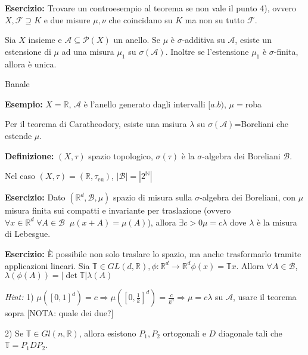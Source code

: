 {\bf Esercizio: } Trovare un controesempio al teorema se non vale il punto 4), ovvero $X, \mathcal{F} \supseteq K$ e due misure $\mu,\nu$ che coincidano su $K$ ma non su tutto $\mathcal{F}$.

\vspace{0.4cm}

Sia $X$ insieme e $\mathcal{A}\subseteq \mathcal{P}(X)$ un anello. Se $\mu$ è $\sigma$-additiva su $\mathcal{A}$, esiste un estensione di $\mu$ ad una misura $\mu_1$ su $\sigma(\mathcal{A})$. Inoltre se l'estensione $\mu_1$ è $\sigma$-finita, allora è unica.

\Dim Banale

\vspace{0.3cm}

{\bf Esempio: } $X=\mathbb{R}$, $\mathcal{A}$ è l'anello generato dagli intervalli $[a.b)$, $\mu=$roba

Per il teorema di Caratheodory, esiste una msiura $\lambda$ su $\sigma(\mathcal{A})$=Boreliani che estende $\mu$.

 
 
 {\bf Definizione: } $(X,\tau)$ spazio topologico, $\sigma(\tau)$ è la $\sigma$-algebra dei Boreliani $\mathcal{B}$.
 
 Nel caso $(X,\tau)=(\mathbb{R},\tau_{\text{eu}})$, $| \mathcal{B} | = | 2^{\mathbb{N}} |$
 
 {\bf Esercizio: } Dato $(\mathbb{R}^d, \mathcal{B}, \mu)$ spazio di misura sulla $\sigma$-algebra dei Boreliani, con $\mu$ misura finita sui compatti e invariante per traslazione (ovvero $\forall x \in \mathbb{R}^d \; \forall A \in \mathcal{B} \; \; \mu(x+A)=\mu(A)$), allora $\exists c>0 \mu=c\lambda$ dove $\lambda$ è la misura di Lebesgue.
 
{\bf Esercizio: } È possibile non solo traslare lo spazio, ma anche trasformarlo tramite applicazioni lineari. Sia $\mathbb{T}\in GL(d,\mathbb{R}), \phi:\mathbb{R}^d \rightarrow \mathbb{R}^d\phi(x)=\mathbb{T}x$. Allora $\forall A \in \mathcal{B}$, $\lambda(\phi(A))=|\det \mathbb{T} | \lambda(A)$

{\it Hint:} 1) $\mu([0,1]^d)=c\Rightarrow \mu([0, \frac{1}{k}]^d)=\frac{c}{k^d}\Rightarrow \mu=c\lambda$ su $\mathcal{A}$, usare il teorema sopra {\color{red}[NOTA: quale dei due?]}

2) Se $\mathbb{T} \in Gl(n,\mathbb{R})$, allora esistono $P_1, P_2$ ortogonali e $D$ diagonale tali che $\mathbb{T}=P_1DP_2$.


